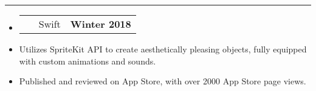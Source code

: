 \documentclass[10pt,letterpaper]{article}
\makeatletter
\newcommand{\header}[2]
{
	\begin{tabular*}{\linewidth}{l @{\extracolsep{\fill}} r}
		#1 & #2 \\
	\end{tabular*}
}
\makeatother
\begin{document}
\hrule

\begin{itemize}
	\item[]
		\header
			{
				\href{https://itunes.apple.com/us/app/tic-tac-emoji/id1346934986?mt=8}{\emph{\underline{\smash{\textbf{Tic-Tac Emoji}}}}} \ \ \ \footnotesize Swift
				}
				{\textbf{Winter 2018}}
		\item
			Utilizes SpriteKit API to create aesthetically pleasing objects, fully equipped with custom animations and sounds.	
		\item
			Published and reviewed on App Store, with over 2000 App Store page views. 
\end{itemize}
\end{document}
